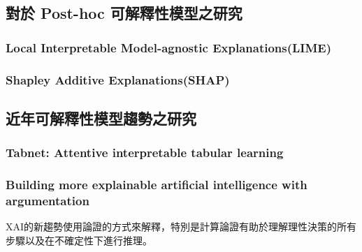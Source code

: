 \documentclass[class=NCU_thesis, crop=false]{standalone}
\begin{document}
\subsection{對於 Post-hoc 可解釋性模型之研究}
\subsubsection{Local Interpretable Model-agnostic Explanations(LIME)} 
\subsubsection{Shapley Additive Explanations(SHAP)}

\subsection{近年可解釋性模型趨勢之研究}
\subsubsection{Tabnet: Attentive interpretable tabular learning}
\subsubsection{Building more explainable artificial intelligence with argumentation}
XAI的新趨勢使用論證的方式來解釋，特別是計算論證有助於理解理性決策的所有步驟以及在不確定性下進行推理。 \cite{LONGO2024102301}
\end{document}
